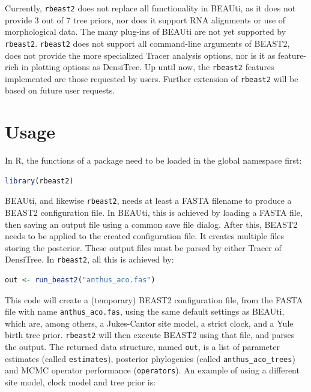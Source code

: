 \documentclass{article}
\begin{document}
Currently, \verb;rbeast2; does not replace all functionality in BEAUti,
as it does not provide 3 out of 7 tree priors, nor does it support RNA
alignments or use of morphological data. The many plug-ins of BEAUti
are not yet supported by \verb;rbeast2;. \verb;rbeast2; does not support
all command-line arguments of BEAST2, does not provide
the more specialized Tracer analysis options, nor is it as feature-rich
in plotting options as DensiTree. Up until now, the \verb;rbeast2; features 
implemented are those requested by users. Further extension of \verb;rbeast2; 
will be based on future user requests.

\section{Usage}

In R, the functions of a package need to be loaded in the global namespace first:

\begin{lstlisting}[language=R, floatplacement=H]
library(rbeast2)
\end{lstlisting}

BEAUti, and likewise \verb;rbeast2;, needs at least a FASTA filename
to produce a BEAST2 configuration file. 
In BEAUti, this is achieved by loading a FASTA file, 
then saving an output file using a common
save file dialog. After this, BEAST2 needs to be applied to
the created configuration file. It creates multiple files
storing the posterior. These output
files must be parsed by either Tracer of DensiTree.
In \verb;rbeast2;, all this is achieved by:

\begin{lstlisting}[language=R, floatplacement=H]
out <- run_beast2("anthus_aco.fas")
\end{lstlisting}

This code will create a (temporary) BEAST2 configuration file,
from the FASTA file with name \verb;anthus_aco.fas;, 
using the same default settings as BEAUti, which are, 
among others, a Jukes-Cantor site model, a strict clock, and a Yule birth tree prior.
\verb;rbeast2; will then execute BEAST2 using that file, and
parses the output. The returned data structure, named \verb;out;, 
is a list of parameter estimates (called \verb;estimates;), posterior 
phylogenies (called \verb;anthus_aco_trees;)
and MCMC operator performance (\verb;operators;).
An example of using a different site model, clock model 
and tree prior is:
\end{document}
